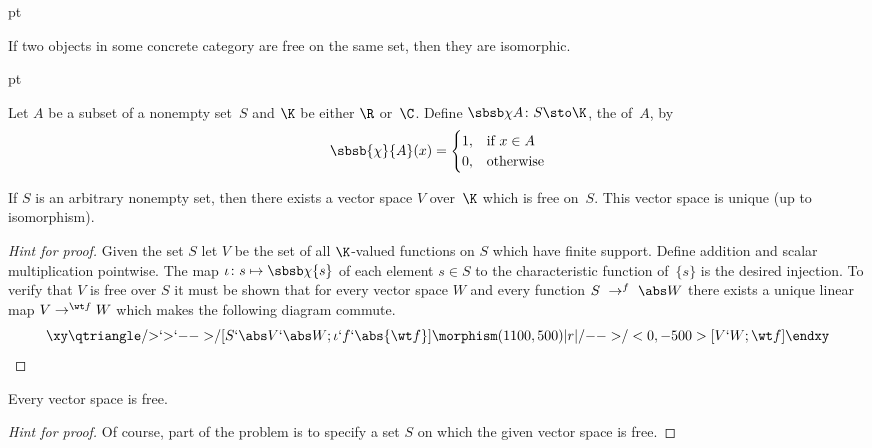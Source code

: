  pt

\begin{prop} If two objects in some concrete category are free on the same set,
then they are isomorphic.
\end{prop}

 pt

\begin{defn} Let $A$ be a subset of a nonempty set~$S$ and $\K$ be either $\R$ or~$\C$. Define
$\sbsb\chi A \colon S \sto \K$, the
 of~$A$, by
  \[ \sbsb{\chi}{A}(x) = \begin{cases}
                                  1, &\text{if $x \in A$} \\
                                  0, &\text{otherwise}
                              \end{cases} \]
\end{defn}

\begin{exam}\label{ump001z} If $S$ is an arbitrary nonempty set,
then there exists a vector space $V$ over~$\K$ which is free on~$S$.  This vector space
is unique (up to isomorphism).
\end{exam}

\begin{proof}[\emph{Hint for proof}] Given the set $S$ let $V$ be the set of all
$\K$-valued functions on $S$ which have finite support. Define addition and scalar
multiplication pointwise. The map $\iota\colon s \mapsto \sbsb \chi {\{s\}}$ of each
element $s \in S$ to the characteristic function of~$\{s\}$ is the desired injection. To
verify that $V$ is free over $S$ it must be shown that for every vector space $W$ and
every function \hbox{$S~\to^{f}~\abs W$} there exists a unique linear map $V \to^{\wt f}
W$ which makes the following diagram commute.
 \[\xy
 \index{l@$l_2 = l_2(\N)$!square summable sequences}%
 \index{l@$l_2 = l_2(\N)$!as an inner product space}%
 \index{inner product!space!$l_2$ as a}%
     \qtriangle/{>}`{>}`{-->}/[S`\abs V`\abs W;\iota`f`\abs{\wt f}]
     \morphism(1100,500)|r|/{-->}/<0,-500>[V`W;\wt f]
   \endxy\]
\ns \end{proof}

\begin{prop} Every vector space is free.
\end{prop}

\begin{proof}[\emph{Hint for proof}] Of course, part of the problem is to specify a set
$S$ on which the given vector space is free. \ns
\end{proof}


